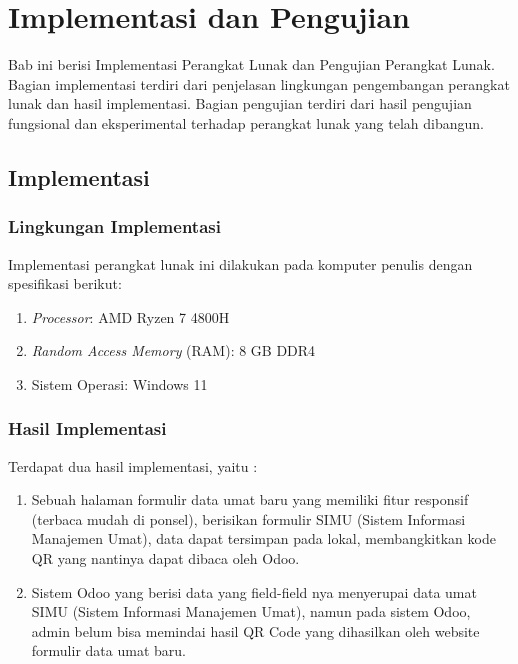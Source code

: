 \chapter{Implementasi dan Pengujian}
\label{chap:implementasiPengujian}

Bab ini berisi Implementasi Perangkat Lunak dan Pengujian Perangkat Lunak. Bagian implementasi terdiri dari penjelasan lingkungan pengembangan perangkat lunak dan hasil implementasi. Bagian pengujian terdiri dari hasil pengujian fungsional dan eksperimental terhadap perangkat lunak yang
telah dibangun.

\section{Implementasi}
\label{sec:implementasi} 

\subsection{Lingkungan Implementasi}
\label{sec:lingkunganImplementasi}

Implementasi perangkat lunak ini dilakukan pada komputer penulis dengan spesifikasi berikut:

\begin{enumerate}
	\item \textit{Processor}: AMD Ryzen 7 4800H
	\item \textit{Random Access Memory} (RAM): 8 GB DDR4
	\item Sistem Operasi: Windows 11
\end{enumerate}

\subsection{Hasil Implementasi}
\label{sec:hasilImplementasi}

Terdapat dua hasil implementasi, yaitu :

\begin{enumerate}
	\item Sebuah halaman formulir data umat baru yang memiliki fitur responsif (terbaca mudah di ponsel), berisikan formulir SIMU (Sistem Informasi Manajemen Umat), data dapat tersimpan pada lokal, membangkitkan kode QR  yang nantinya dapat dibaca oleh Odoo.
	\item Sistem Odoo yang berisi data yang field-field nya menyerupai data umat SIMU (Sistem Informasi Manajemen Umat), namun pada sistem Odoo, admin belum bisa memindai hasil QR Code yang dihasilkan oleh website formulir data umat baru.
\end{enumerate}

